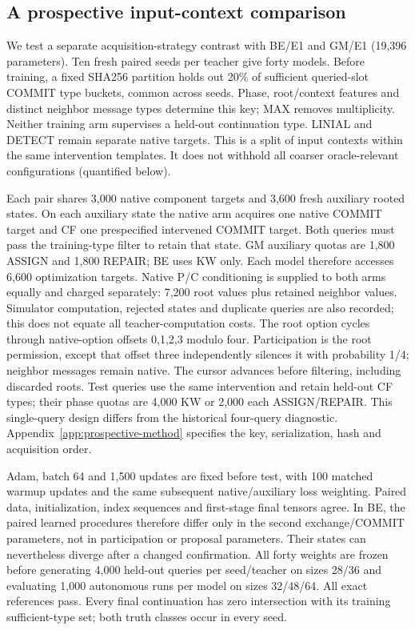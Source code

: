 \subsection{A prospective input-context comparison}\label{sec:prospective}
We test a separate acquisition-strategy contrast with BE/E1 and GM/E1
(19,396 parameters). Ten fresh paired seeds per teacher give forty models.
Before training, a fixed SHA256 partition holds out 20\% of sufficient
queried-slot COMMIT type buckets, common across seeds. Phase, root/context
features and distinct neighbor message types determine this key; MAX removes
multiplicity. Neither training arm supervises a held-out continuation type.
LINIAL and DETECT remain separate native targets. This is a split of input
contexts within the same intervention templates. It does not withhold all
coarser oracle-relevant configurations (quantified below).

Each pair shares 3,000 native component targets and 3,600 fresh auxiliary
rooted states. On each auxiliary state the native arm acquires one native
COMMIT target and CF one prespecified intervened COMMIT target. Both queries
must pass the training-type filter to retain that state. GM auxiliary quotas
are 1,800 ASSIGN and 1,800 REPAIR; BE uses KW only. Each model therefore
accesses 6,600 optimization targets. Native P/C conditioning is supplied to
both arms equally and charged separately: 7,200 root values plus retained
neighbor values. Simulator computation, rejected states and duplicate queries
are also recorded; this does not equate all teacher-computation costs.
The root option cycles through native-option offsets 0,1,2,3 modulo four.
Participation is the root permission, except that offset three independently
silences it with probability 1/4; neighbor messages remain native. The cursor
advances before filtering, including discarded roots. Test queries use the
same intervention and retain held-out CF types; their phase quotas are
4,000 KW or 2,000 each ASSIGN/REPAIR. This single-query design differs from
the historical four-query diagnostic. Appendix~\ref{app:prospective-method}
specifies the key, serialization, hash and acquisition order.

Adam, batch 64 and 1,500 updates are fixed before test, with 100 matched warmup
updates and the same subsequent native/auxiliary loss weighting. Paired data,
initialization, index sequences and first-stage final tensors agree. In BE,
the paired learned procedures therefore differ only in the second
exchange/COMMIT parameters, not in participation or proposal parameters.
Their states can nevertheless diverge after a changed confirmation. All forty
weights are frozen before generating 4,000 held-out queries per seed/teacher
on sizes 28/36 and evaluating 1,000 autonomous runs per model on sizes 32/48/64.
All exact references pass. Every final continuation has zero intersection
with its training sufficient-type set; both truth classes occur in every seed.


